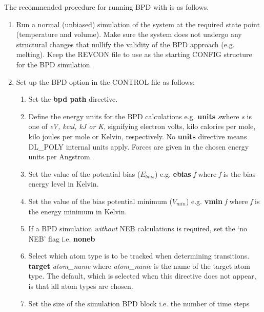 The recommended procedure for running BPD with \D{} is as follows.
\begin{enumerate}
\item Run a normal (unbiased) simulation of the system at the required
state point (temperature and volume). Make sure the system does not
undergo any structural changes that nullify the validity of the BPD
approach (e.g. melting). Keep the REVCON file to use as the starting
CONFIG structure for the BPD simulation.
\item Set up the BPD option in the CONTROL file as follows:
\begin{enumerate}
\item Set the {\bf bpd path} directive.
\item Define the energy units for the BPD calculations e.g. \newline
      {\bf units} {\em s}\newline where {\em s} is one of {\em eV,
      kcal, kJ or K}, signifying electron volts, kilo calories per mole,
      kilo joules per mole or Kelvin, respectively. No {\bf units}
      directive means DL\_POLY internal units apply. Forces are given 
      in the chosen energy units per Angstrom.
\item Set the value of the potential bias ($E_{bias}$) e.g. \newline
      {\bf ebias} {\em f} \newline
      where {\em f} is the bias energy level in Kelvin.
\item Set the value of the bias potential minimum ($V_{min}$) e.g. \newline
      {\bf vmin} {\em f} \newline
      where {\em f} is the energy minimum in Kelvin.
\item If a BPD simulation {\em without} NEB calculations is required, set the
      `no NEB' flag i.e. \newline
      {\bf noneb} \newline
\item Select which atom type is to be tracked when determining transitions.
      \newline
      {\bf target} {\em atom\_name} \newline
      where {\em atom\_name} is the name of the target atom type. The default,
      which is selected when this directive does not appear, is that all atom
      types are chosen.
\item Set the size of the simulation BPD block i.e. the number of time steps

\end{enumerate}
\end{enumerate}
